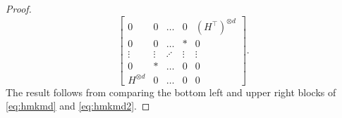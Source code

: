 \documentclass{theoretics}
\begin{document}
\begin{proof}
\begin{equation}
        \begin{bmatrix} 
            0 & 0 & \ldots & 0 & (H^\top)^{\otimes d}\\
            0 & 0 & \ldots & * & 0\\
            \vdots & \vdots & \iddots & \vdots & \vdots \\
            0 & * & \ldots & 0 & 0\\
            H^{\otimes d} & 0 & \ldots & 0 & 0
        \end{bmatrix}.
        \label{eq:hmkmd2}
    \end{equation}
    The result follows from
    comparing the bottom left and upper right blocks of \eqref{eq:hmkmd} and \eqref{eq:hmkmd2}.
\end{proof}
\end{document}
